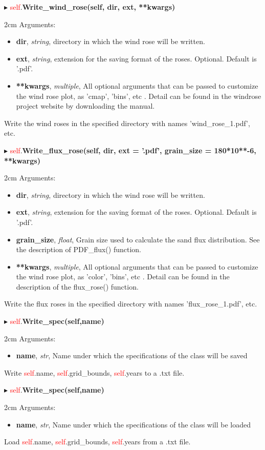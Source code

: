 \documentclass[12pt]{article}
\newenvironment{myenv}{\begin{adjustwidth}{2cm}{}}{\end{adjustwidth}}
\newcommand{\ClassFunction}[3]{\filbreak\noindent
$\blacktriangleright$ \quad \textcolor{red}{self}.\textbf{#1}

\begin{myenv}
Arguments: {#2}

{#3}
\end{myenv}
\vspace*{0.4 cm}}
\newcommand{\Argument}[3]{\noindent 
\textbf{#1}, \textit{#2}, {#3}}
\begin{document}
\ClassFunction{Write\_wind\_rose(self, dir, ext, **kwargs)}{
\begin{itemize}
	\item \Argument{dir}{string}{directory in which the wind rose will be written.}
	\item \Argument{ext}{string}{extension for the saving format of the roses. Optional. Default is '.pdf'.}
	\item \Argument{**kwargs}{multiple}{All optional arguments that can be passed to customize the wind rose plot, as 'cmap', 'bins', etc . Detail can be found in the windrose project website by downloading the manual.}
\end{itemize}
}{Write the wind roses in the specified directory with names 'wind\_rose\_1.pdf', etc.}

\ClassFunction{Write\_flux\_rose(self, dir, ext = '.pdf', grain\_size = 180*10**-6, **kwargs)}{
\begin{itemize}
	\item \Argument{dir}{string}{directory in which the wind rose will be written.}
	\item \Argument{ext}{string}{extension for the saving format of the roses. Optional. Default is '.pdf'.}
	\item \Argument{grain\_size}{float}{Grain size used to calculate the sand flux distribution. See the description of PDF\_flux() function.}
	\item \Argument{**kwargs}{multiple}{All optional arguments that can be passed to customize the wind rose plot, as 'color', 'bins', etc . Detail can be found in the description of the flux\_rose() function.}
\end{itemize}
}{Write the flux roses in the specified directory with names 'flux\_rose\_1.pdf', etc.}

\ClassFunction{Write\_spec(self,name)}{
\begin{itemize}
	\item \Argument{name}{str}{Name under which the specifications of the class will be saved}
\end{itemize}
}{Write \textcolor{red}{self}.name, \textcolor{red}{self}.grid\_bounds, \textcolor{red}{self}.years to a .txt file.}


\ClassFunction{Write\_spec(self,name)}{
\begin{itemize}
	\item \Argument{name}{str}{Name under which the specifications of the class will be loaded}
\end{itemize}
}{Load \textcolor{red}{self}.name, \textcolor{red}{self}.grid\_bounds, \textcolor{red}{self}.years from a .txt file.}
\end{document}
